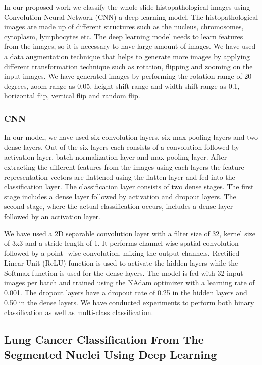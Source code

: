 \documentclass[conference]{IEEEtran}
\begin{document}
In our proposed work we classify the whole slide histopathological images using  Convolution Neural Network (CNN) a deep learning model. The histopathological images are made up of  different structures such as the nucleus, chromosomes, cytoplasm, lymphocytes etc. The deep learning model needs to learn features from the images, so it is necessary to have large amount of images. We have used a data augmentation technique that helps to generate more images by applying different transformation technique such as rotation, flipping and zooming on the input images. We have  generated images by performing  the rotation range of 20 degrees, zoom range as 0.05, height shift range and width shift range as 0.1, horizontal flip, vertical flip and random flip.

\subsubsection{CNN}
In our model, we have used six convolution layers, six max pooling layers and two dense layers. Out of the six layers each consists of a convolution followed by activation layer, batch normalization layer and max-pooling layer. After extracting the different features from the images using each layers the feature representation vectors are flattened using the flatten layer and fed into the classification layer. The classification layer consists of two dense  stages. The first stage includes a dense layer followed by activation and dropout layers. The second stage, where the actual classification occurs, includes a dense layer followed by an activation layer.

We have used a 2D separable convolution layer with a filter size of 32, kernel size of 3x3 and a stride length of 1. It performs channel-wise spatial convolution followed by a point- wise convolution, mixing the output channels.  Rectified Linear Unit (ReLU) function is used to activate the hidden layers while the Softmax function is used for the dense layers. The model is fed with 32 input images per batch and trained using the NAdam optimizer with a learning rate of 0.001. The dropout layers have a dropout rate of 0.25 in the hidden layers and 0.50 in the dense layers. We have conducted experiments to perform both binary classification as well as multi-class classification.

\subsection{Lung Cancer Classification From The Segmented Nuclei Using Deep Learning}
\end{document}
